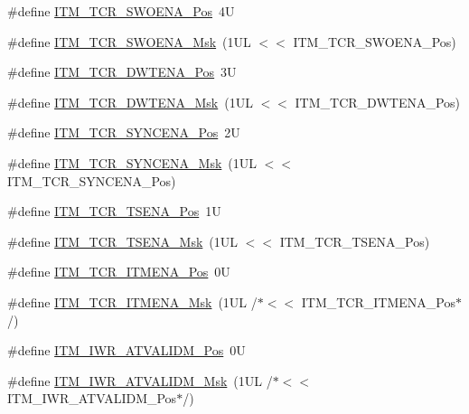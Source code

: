 \begin{DoxyCompactItemize}
\#define \hyperlink{group___c_m_s_i_s___i_t_m_ga7a380f0c8078f6560051406583ecd6a5}{I\-T\-M\-\_\-\-T\-C\-R\-\_\-\-S\-W\-O\-E\-N\-A\-\_\-\-Pos}~4\-U
\item 
\#define \hyperlink{group___c_m_s_i_s___i_t_m_ga97476cb65bab16a328b35f81fd02010a}{I\-T\-M\-\_\-\-T\-C\-R\-\_\-\-S\-W\-O\-E\-N\-A\-\_\-\-Msk}~(1\-U\-L $<$$<$ I\-T\-M\-\_\-\-T\-C\-R\-\_\-\-S\-W\-O\-E\-N\-A\-\_\-\-Pos)
\item 
\#define \hyperlink{group___c_m_s_i_s___i_t_m_ga30e83ebb33aa766070fe3d1f27ae820e}{I\-T\-M\-\_\-\-T\-C\-R\-\_\-\-D\-W\-T\-E\-N\-A\-\_\-\-Pos}~3\-U
\item 
\#define \hyperlink{group___c_m_s_i_s___i_t_m_ga98ea1c596d43d3633a202f9ee746cf70}{I\-T\-M\-\_\-\-T\-C\-R\-\_\-\-D\-W\-T\-E\-N\-A\-\_\-\-Msk}~(1\-U\-L $<$$<$ I\-T\-M\-\_\-\-T\-C\-R\-\_\-\-D\-W\-T\-E\-N\-A\-\_\-\-Pos)
\item 
\#define \hyperlink{group___c_m_s_i_s___i_t_m_gaa93a1147a39fc63980d299231252a30e}{I\-T\-M\-\_\-\-T\-C\-R\-\_\-\-S\-Y\-N\-C\-E\-N\-A\-\_\-\-Pos}~2\-U
\item 
\#define \hyperlink{group___c_m_s_i_s___i_t_m_gac89b74a78701c25b442105d7fe2bbefb}{I\-T\-M\-\_\-\-T\-C\-R\-\_\-\-S\-Y\-N\-C\-E\-N\-A\-\_\-\-Msk}~(1\-U\-L $<$$<$ I\-T\-M\-\_\-\-T\-C\-R\-\_\-\-S\-Y\-N\-C\-E\-N\-A\-\_\-\-Pos)
\item 
\#define \hyperlink{group___c_m_s_i_s___i_t_m_ga5aa381845f810114ab519b90753922a1}{I\-T\-M\-\_\-\-T\-C\-R\-\_\-\-T\-S\-E\-N\-A\-\_\-\-Pos}~1\-U
\item 
\#define \hyperlink{group___c_m_s_i_s___i_t_m_ga436b2e8fa24328f48f2da31c00fc9e65}{I\-T\-M\-\_\-\-T\-C\-R\-\_\-\-T\-S\-E\-N\-A\-\_\-\-Msk}~(1\-U\-L $<$$<$ I\-T\-M\-\_\-\-T\-C\-R\-\_\-\-T\-S\-E\-N\-A\-\_\-\-Pos)
\item 
\#define \hyperlink{group___c_m_s_i_s___i_t_m_ga3286b86004bce7ffe17ee269f87f8d9d}{I\-T\-M\-\_\-\-T\-C\-R\-\_\-\-I\-T\-M\-E\-N\-A\-\_\-\-Pos}~0\-U
\item 
\#define \hyperlink{group___c_m_s_i_s___i_t_m_ga7dd53e3bff24ac09d94e61cb595cb2d9}{I\-T\-M\-\_\-\-T\-C\-R\-\_\-\-I\-T\-M\-E\-N\-A\-\_\-\-Msk}~(1\-U\-L /$\ast$$<$$<$ I\-T\-M\-\_\-\-T\-C\-R\-\_\-\-I\-T\-M\-E\-N\-A\-\_\-\-Pos$\ast$/)
\item 
\#define \hyperlink{group___c_m_s_i_s___i_t_m_ga04d3f842ad48f6a9127b4cecc963e1d7}{I\-T\-M\-\_\-\-I\-W\-R\-\_\-\-A\-T\-V\-A\-L\-I\-D\-M\-\_\-\-Pos}~0\-U
\item 
\#define \hyperlink{group___c_m_s_i_s___i_t_m_ga67b969f8f04ed15886727788f0e2ffd7}{I\-T\-M\-\_\-\-I\-W\-R\-\_\-\-A\-T\-V\-A\-L\-I\-D\-M\-\_\-\-Msk}~(1\-U\-L /$\ast$$<$$<$ I\-T\-M\-\_\-\-I\-W\-R\-\_\-\-A\-T\-V\-A\-L\-I\-D\-M\-\_\-\-Pos$\ast$/)

\end{DoxyCompactItemize}
